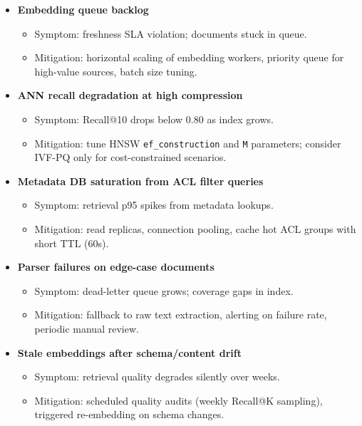 \begin{itemize}
  \item \textbf{Embedding queue backlog}
  \begin{itemize}
    \item Symptom: freshness SLA violation; documents stuck in queue.
    \item Mitigation: horizontal scaling of embedding workers, priority queue for high-value sources, batch size tuning.
  \end{itemize}

  \item \textbf{ANN recall degradation at high compression}
  \begin{itemize}
    \item Symptom: Recall@10 drops below 0.80 as index grows.
    \item Mitigation: tune HNSW \texttt{ef\_construction} and \texttt{M} parameters; consider IVF-PQ only for cost-constrained scenarios.
  \end{itemize}

  \item \textbf{Metadata DB saturation from ACL filter queries}
  \begin{itemize}
    \item Symptom: retrieval p95 spikes from metadata lookups.
    \item Mitigation: read replicas, connection pooling, cache hot ACL groups with short TTL (60s).
  \end{itemize}

  \item \textbf{Parser failures on edge-case documents}
  \begin{itemize}
    \item Symptom: dead-letter queue grows; coverage gaps in index.
    \item Mitigation: fallback to raw text extraction, alerting on failure rate, periodic manual review.
  \end{itemize}

  \item \textbf{Stale embeddings after schema/content drift}
  \begin{itemize}
    \item Symptom: retrieval quality degrades silently over weeks.
    \item Mitigation: scheduled quality audits (weekly Recall@K sampling), triggered re-embedding on schema changes.
  \end{itemize}
\end{itemize}


